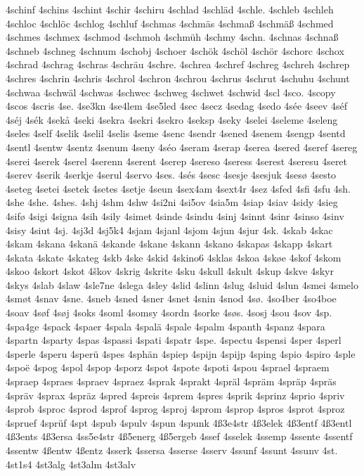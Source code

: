 4schinf
4schins
4schint
4schir
4schiru
4schlad
4schläd
4schle.
4schleb
4schleh
4schloc
4schlöc
4schlog
4schluf
4schmas
4schmäs
4schmaß
4schmäß
4schmed
4schmes
4schmex
4schmod
4schmoh
4schmüh
4schmy
4schn.
4schnas
4schnaß
4schneb
4schneg
4schnum
4schobj
4schoer
4schök
4schöl
4schör
4schorc
4schox
4schrad
4schrag
4schras
4schräu
4schre.
4schrea
4schref
4schreg
4schreh
4schrep
4schres
4schrin
4schris
4schrol
4schron
4schrou
4schrus
4schrut
4schuhu
4schunt
4schwaa
4schwäl
4schwas
4schwec
4schweg
4schwet
4schwid
4scl
4sco.
4scopy
4scos
4scris
4se.
4se3kn
4se4lem
4se5led
4sec
4secz
4sedag
4sedo
4sée
4seev
4séf
4séj
4sék
4sekå
4seki
4sekra
4sekri
4sekro
4seksp
4seky
4selei
4seleme
4seleng
4seles
4self
4selik
4selil
4selis
4seme
4senc
4sendr
4sened
4senem
4sengp
4sentd
4sentl
4sentw
4sentz
4senum
4seny
4séo
4seram
4serap
4serea
4sered
4seref
4sereg
4serei
4serek
4serel
4serenn
4serent
4serep
4sereso
4seress
4serest
4seresu
4seret
4serev
4serik
4serkje
4serul
4servo
4ses.
4sés
4sesc
4sesje
4sesjuk
4sesø
4sesto
4seteg
4setei
4setek
4setes
4setje
4seun
4sex4am
4sext4r
4sez
4sfed
4sfi
4sfu
4sh.
4she
4she.
4shes.
4shj
4shm
4shw
4si2ni
4si5ov
4sia5m
4siap
4siav
4sidy
4sieg
4sifø
4sigi
4signa
4sih
4sily
4simet
4sinde
4sindu
4sinj
4sinnt
4sinr
4sinso
4sinv
4sisy
4siut
4sj.
4sj3d
4sj5k4
4sjam
4sjanl
4sjom
4sjun
4sjur
4sk.
4skab
4skac
4skam
4skana
4skanä
4skande
4skane
4skann
4skano
4skapas
4skapp
4skart
4skata
4skate
4skateg
4skb
4ske
4skid
4skino6
4sklas
4skoa
4skøe
4skof
4skom
4skoo
4skort
4skot
4škov
4skrig
4skrite
4sku
4skull
4skult
4skup
4skve
4skyr
4skys
4slab
4slaw
4sle7ne
4slega
4sley
4slid
4slinn
4slug
4sluid
4slun
4smei
4smelo
4smøt
4snav
4sne.
4sneb
4sned
4sner
4snet
4snin
4snod
4sø.
4so4ber
4so4boe
4soav
4søf
4søj
4soks
4soml
4somsy
4sordn
4sorke
4søs.
4sosj
4sou
4sov
4sp.
4spa4ge
4spack
4spaer
4spala
4spalä
4spale
4spalm
4spanth
4spanz
4spara
4spartn
4sparty
4spas
4spassi
4spati
4spatr
4spe.
4spectu
4spensi
4sper
4sperl
4sperle
4speru
4sperü
4spes
4sphän
4spiep
4spijn
4spijp
4sping
4spio
4spiro
4sple
4spoë
4spog
4spol
4spop
4sporz
4spot
4spote
4spoti
4spou
4sprael
4spraem
4spraep
4spraes
4spraev
4spraez
4sprak
4sprakt
4spräl
4spräm
4spräp
4spräs
4spräv
4sprax
4spräz
4spred
4spreis
4sprem
4spres
4sprik
4sprinz
4sprio
4spriv
4sprob
4sproc
4sprod
4sprof
4sprog
4sproj
4sprom
4sprop
4spros
4sprot
4sproz
4spruef
4sprüf
4spt
4spub
4spulv
4spun
4spunk
4ß3e4str
4ß3elek
4ß3entf
4ß3entl
4ß3ents
4ß3ersa
4ss5e4str
4ß5energ
4ß5ergeb
4ssef
4sselek
4ssemp
4ssente
4ssentf
4ssentw
4ßentw
4ßentz
4sserk
4ssersa
4sserse
4sserv
4ssunf
4ssunt
4ssunv
4st.
4st1s4
4st3alg
4st3alm
4st3alv
